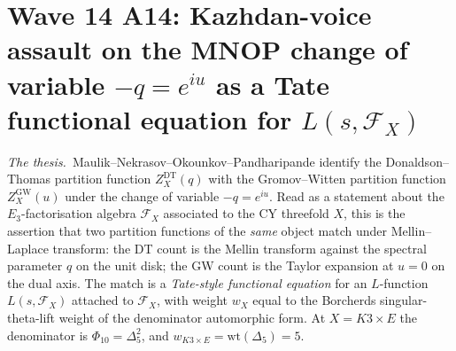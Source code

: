 \providecommand{\kBKM}{\kappa_{\mathrm{BKM}}}
\providecommand{\kch}{\kappa_{\mathrm{ch}}}
\providecommand{\kcat}{\kappa_{\mathrm{cat}}}
\providecommand{\kfib}{\kappa_{\mathrm{fiber}}}
\providecommand{\ClaimStatusTheorem}{\textbf{[Thm]}}
\providecommand{\ClaimStatusDerivation}{\textbf{[derivable]}}
\providecommand{\ClaimStatusConjectured}{\textbf{[Conj]}}
\providecommand{\ClaimStatusDefinition}{\textbf{[Def]}}
\providecommand{\ClaimStatusCorrected}{\textbf{[Corrected]}}
\providecommand{\Sp}{\mathrm{Sp}}
\providecommand{\OO}{\mathrm{O}}
\providecommand{\SO}{\mathrm{SO}}
\providecommand{\GL}{\mathrm{GL}}
\providecommand{\Hb}{\mathbb{H}}
\providecommand{\fg}{\mathfrak{g}}
\providecommand{\fh}{\mathfrak{h}}
\providecommand{\cO}{\mathcal{O}}
\providecommand{\cF}{\mathcal{F}}
\providecommand{\cL}{\mathcal{L}}
\providecommand{\cM}{\mathcal{M}}
\providecommand{\cA}{\mathcal{A}}
\providecommand{\cH}{\mathcal{H}}
\providecommand{\C}{\mathbb{C}}
\providecommand{\R}{\mathbb{R}}
\providecommand{\Z}{\mathbb{Z}}
\providecommand{\Q}{\mathbb{Q}}
\providecommand{\CoHA}{\mathrm{CoHA}}
\providecommand{\Hilb}{\mathrm{Hilb}}
\providecommand{\DT}{\mathrm{DT}}
\providecommand{\GW}{\mathrm{GW}}
\providecommand{\PT}{\mathrm{PT}}
\providecommand{\mult}{\mathrm{mult}}
\providecommand{\Mel}{\mathcal{M}}

\section*{Wave 14 A14: Kazhdan-voice assault on the MNOP change of
variable $-q=e^{iu}$ as a Tate functional equation for
$L(s,\cF_X)$}
\label{sec:wave14-a14-kazhdan-MNOP-L-function}

\noindent\emph{The thesis.}\ Maulik--Nekrasov--Okounkov--Pandharipande
identify the Donaldson--Thomas partition function
$Z^{\DT}_X(q)$ with the Gromov--Witten partition function
$Z^{\GW}_X(u)$ under the change of variable $-q=e^{iu}$. Read as
a statement about the $E_3$-factorisation algebra $\cF_X$
associated to the CY threefold $X$, this is the assertion that two
partition functions of the \emph{same} object match under
Mellin--Laplace transform: the DT count is the Mellin transform
against the spectral parameter $q$ on the unit disk; the GW count
is the Taylor expansion at $u=0$ on the dual axis. The match is a
\emph{Tate-style functional equation} for an $L$-function
$L(s,\cF_X)$ attached to $\cF_X$, with weight $w_X$ equal to the
Borcherds singular-theta-lift weight of the denominator
automorphic form. At $X=K3\times E$ the denominator is $\Phi_{10}=
\Delta_5^2$, and $w_{K3\times E}=\mathrm{wt}(\Delta_5)=5$.

